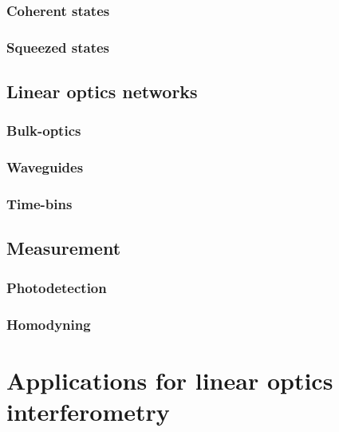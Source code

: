\documentclass[aps,rmp,twocolumn,amsmath,amssymb,nofootinbib,superscriptaddress]{revtex4}
\newcommand{\sihui}[1]{{\color{Orchid}{#1}}}
\newcommand{\comment}[1]{{\color{blue}{#1}}}
\begin{document}
\subsubsection{Coherent states}

\subsubsection{Squeezed states}

\subsection{Linear optics networks}

\subsubsection{Bulk-optics}

\subsubsection{Waveguides}

\subsubsection{Time-bins}

\comment{Discuss fibre-loop architecture}

\sihui{Peter to fill this in}
\cite{bib:Motes14}


\subsection{Measurement}

\subsubsection{Photodetection}

\comment{Discuss number-resolved and bucket detectors, multiplexed detection, APDs, current micropillar detectors}

\subsubsection{Homodyning}

\section{Applications for linear optics interferometry}
\end{document}
